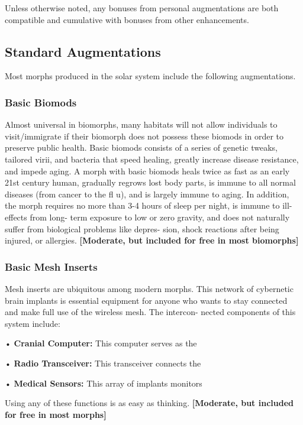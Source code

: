 Unless otherwise noted, any bonuses from personal 
augmentations are both compatible and cumulative 
with bonuses from other enhancements.

\subsection{Standard Augmentations}

Most morphs produced in the solar system include the 
following augmentations.

\subsubsection{Basic Biomods}

Almost universal in biomorphs, many habitats will not 
allow individuals to visit/immigrate if their biomorph 
does not possess these biomods in order to preserve 
public health. Basic biomods consists of a series of 
genetic tweaks, tailored virii, and bacteria that speed 
healing, greatly increase disease resistance, and impede 
aging. A morph with basic biomods heals twice as fast 
as an early 21st century human, gradually regrows lost 
body parts, is immune to all normal diseases (from 
cancer to the fl u), and is largely immune to aging. In 
addition, the morph requires no more than 3-4 hours 
of sleep per night, is immune to ill-effects from long-
term exposure to low or zero gravity, and does not 
naturally suffer from biological problems like depres-
sion, shock reactions after being injured, or allergies. 
\textbf{[Moderate, but included for free in most biomorphs]}

\subsubsection{Basic Mesh Inserts}

Mesh inserts are ubiquitous among modern morphs. 
This network of cybernetic brain implants is essential 
equipment for anyone who wants to stay connected 
and make full use of the wireless mesh. The intercon-
nected components of this system include:

•  \textbf{Cranial Computer:} This computer serves as the 

•  \textbf{Radio Transceiver:} This transceiver connects the 

•  \textbf{Medical Sensors:} This array of implants monitors 

Using any of these functions is as easy as thinking. 
\textbf{[Moderate, but included for free in most morphs]}

